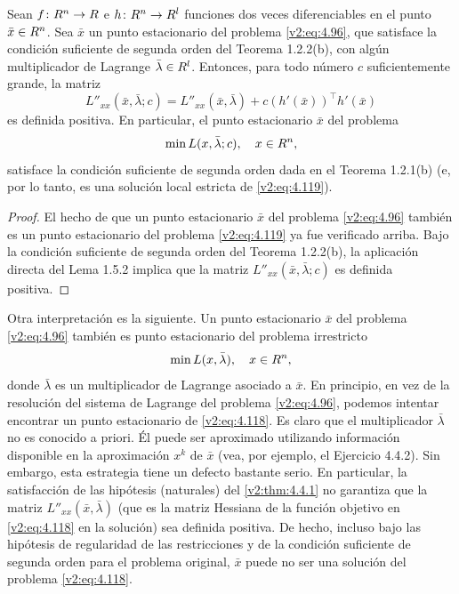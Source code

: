 \begin{theorem}\label{v2:thm:4.4.5}
    Sean $f \colon R^n \to R$ e $h \colon R^n \to R^l$ funciones dos veces diferenciables en el punto $\bar{x} \in R^n$. Sea $\bar{x}$ un punto estacionario del problema \eqref{v2:eq:4.96}, que satisface la condición suficiente de segunda orden del Teorema 1.2.2(b), con algún multiplicador de Lagrange $\bar{\lambda} \in R^l$.
    Entonces, para todo número $c$ suficientemente grande, la matriz
    \[
        L''_{xx}(\bar{x}, \bar{\lambda}; c) = L''_{xx}(\bar{x}, \bar{\lambda}) + c(h'(\bar{x}))^\top h'(\bar{x})
    \]
    es definida positiva. En particular, el punto estacionario $\bar{x}$ del problema
    \begin{equation}
        \min L(x, \bar{\lambda}; c), \quad x \in R^n,
        \label{v2:eq:4.119}
    \end{equation}
    satisface la condición suficiente de segunda orden dada en el Teorema 1.2.1(b) (e, por lo tanto, es una solución local estricta de \eqref{v2:eq:4.119}).
\end{theorem}
\begin{proof}
    El hecho de que un punto estacionario $\bar{x}$ del problema \eqref{v2:eq:4.96} también es un punto estacionario del problema \eqref{v2:eq:4.119} ya fue verificado arriba. Bajo la condición suficiente de segunda orden del Teorema 1.2.2(b), la aplicación directa del Lema 1.5.2 implica que la matriz $L''_{xx}(\bar{x}, \bar{\lambda}; c)$ es definida positiva.
\end{proof}

Otra interpretación es la siguiente. Un punto estacionario $\bar{x}$ del problema \eqref{v2:eq:4.96} también es punto estacionario del problema irrestricto
\begin{equation}
    \min L(x, \bar{\lambda}), \quad x \in R^n,
    \label{v2:eq:4.118}
\end{equation}
donde $\bar{\lambda}$ es un multiplicador de Lagrange asociado a $\bar{x}$. En principio, en vez de la resolución del sistema de Lagrange del problema \eqref{v2:eq:4.96}, podemos intentar encontrar un punto estacionario de \eqref{v2:eq:4.118}. Es claro que el multiplicador $\bar{\lambda}$ no es conocido a priori. Él puede ser aproximado utilizando información disponible en la aproximación $x^k$ de $\bar{x}$ (vea, por ejemplo, el Ejercicio 4.4.2). Sin embargo, esta estrategia tiene un defecto bastante serio. En particular, la satisfacción de las hipótesis (naturales) del \cref{v2:thm:4.4.1} no garantiza que la matriz $L''_{xx}(\bar{x}, \bar{\lambda})$ (que es la matriz Hessiana de la función objetivo en \eqref{v2:eq:4.118} en la solución) sea definida positiva. De hecho, incluso bajo las hipótesis de regularidad de las restricciones y de la condición suficiente de segunda orden para el problema original, $\bar{x}$ puede no ser una solución del problema \eqref{v2:eq:4.118}.

